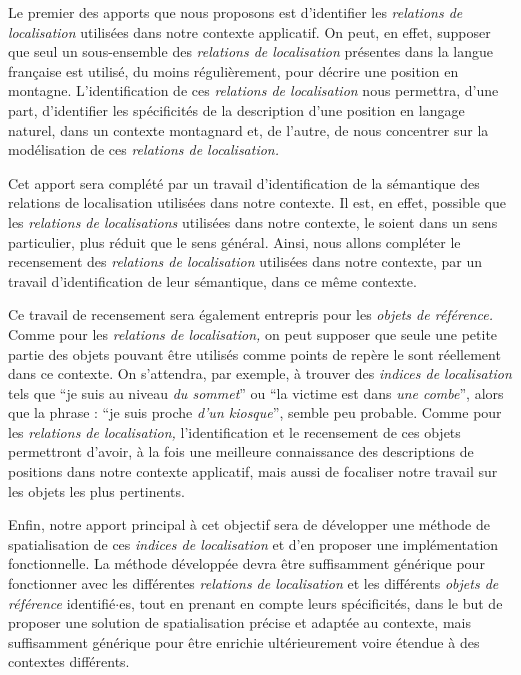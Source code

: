Le premier des apports que nous proposons est d'identifier les
\emph{relations de localisation} utilisées dans notre contexte
applicatif. On peut, en effet, supposer que seul un sous-ensemble des
\emph{relations de localisation} présentes dans la langue française
est utilisé, du moins régulièrement, pour décrire une position en
montagne. L'identification de ces \emph{relations de localisation}
nous permettra, d'une part, d'identifier les spécificités de la
description d'une position en langage naturel, dans un contexte
montagnard et, de l'autre, de nous concentrer sur la modélisation de
ces \emph{relations de localisation.}

Cet apport sera complété par un travail d'identification de la
sémantique des relations de localisation utilisées dans notre
contexte. Il est, en effet, possible que les \emph{relations de
  localisations} utilisées dans notre contexte, le soient dans un sens
particulier, plus réduit que le sens général. Ainsi, nous allons
compléter le recensement des \emph{relations de localisation}
utilisées dans notre contexte, par un travail d'identification de leur
sémantique, dans ce même contexte.

Ce travail de recensement sera également entrepris pour les
\emph{objets de référence.} Comme pour les \emph{relations de
  localisation,} on peut supposer que seule une petite partie des
objets pouvant être utilisés comme points de repère le sont réellement
dans ce contexte. On s'attendra, par exemple, à trouver des
\emph{indices de localisation} tels que \enquote{je suis au niveau
  \emph{du sommet}} ou \enquote{la victime est dans \emph{une combe}},
alors que la phrase : \enquote{je suis proche \emph{d'un kiosque}},
semble peu probable. Comme pour les \emph{relations de localisation,}
l'identification et le recensement de ces objets permettront d'avoir,
à la fois une meilleure connaissance des descriptions de positions
dans notre contexte applicatif, mais aussi de focaliser notre travail
sur les objets les plus pertinents.

Enfin, notre apport principal à cet objectif sera de développer une
méthode de spatialisation de ces \emph{indices de localisation} et
d'en proposer une implémentation fonctionnelle. La méthode développée
devra être suffisamment générique pour fonctionner avec les
différentes \emph{relations de localisation} et les différents
\emph{objets de référence} identifié$\cdot$es, tout en prenant en
compte leurs spécificités, dans le but de proposer une solution de
spatialisation précise et adaptée au contexte, mais suffisamment
générique pour être enrichie ultérieurement voire étendue à des
contextes différents.

